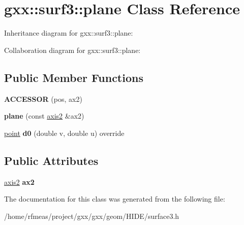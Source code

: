 \hypertarget{classgxx_1_1surf3_1_1plane}{}\section{gxx\+:\+:surf3\+:\+:plane Class Reference}
\label{classgxx_1_1surf3_1_1plane}


Inheritance diagram for gxx\+:\+:surf3\+:\+:plane\+:


Collaboration diagram for gxx\+:\+:surf3\+:\+:plane\+:
\subsection*{Public Member Functions}
\begin{DoxyCompactItemize}
\item 
{\bfseries A\+C\+C\+E\+S\+S\+OR} (pos, ax2)\hypertarget{classgxx_1_1surf3_1_1plane_a337b8cac9ac98d3e4f8c6f20f0301dde}{}\label{classgxx_1_1surf3_1_1plane_a337b8cac9ac98d3e4f8c6f20f0301dde}

\item 
{\bfseries plane} (const \hyperlink{classgxx_1_1geom3_1_1axis2}{axis2} \&ax2)\hypertarget{classgxx_1_1surf3_1_1plane_a1e0309f6c3c0fa2d71b67ed413e9ad4f}{}\label{classgxx_1_1surf3_1_1plane_a1e0309f6c3c0fa2d71b67ed413e9ad4f}

\item 
\hyperlink{classgxx_1_1geom3_1_1point}{point} {\bfseries d0} (double v, double u) override\hypertarget{classgxx_1_1surf3_1_1plane_a16681dab3415d2f21745d2c585374998}{}\label{classgxx_1_1surf3_1_1plane_a16681dab3415d2f21745d2c585374998}

\end{DoxyCompactItemize}
\subsection*{Public Attributes}
\begin{DoxyCompactItemize}
\item 
\hyperlink{classgxx_1_1geom3_1_1axis2}{axis2} {\bfseries ax2}\hypertarget{classgxx_1_1surf3_1_1plane_a5e7d2ce96718acf90ced2830e74c996d}{}\label{classgxx_1_1surf3_1_1plane_a5e7d2ce96718acf90ced2830e74c996d}

\end{DoxyCompactItemize}


The documentation for this class was generated from the following file\+:\begin{DoxyCompactItemize}
\item 
/home/rfmeas/project/gxx/gxx/geom/\+H\+I\+D\+E/surface3.\+h\end{DoxyCompactItemize}

